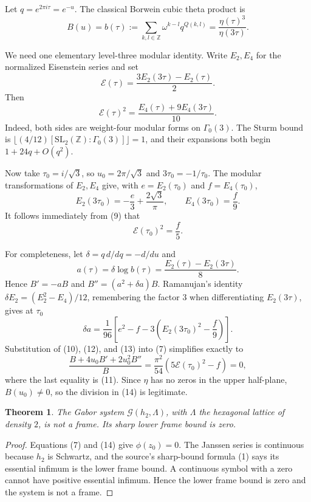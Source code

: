 \documentclass[11pt]{article}
\newtheorem{theorem}{Theorem}
\newcommand{\Z}{\mathbb Z}
\begin{document}
Let \(q=e^{2\pi i\tau}=e^{-u}\).  The classical Borwein cubic theta
product \cite{Borwein} is
\[
 B(u)=b(\tau):=\sum_{k,l\in\Z}\omega^{k-l}q^{Q(k,l)}
 =\frac{\eta(\tau)^3}{\eta(3\tau)}.                     \tag{8}
\]

We need one elementary level-three modular identity.  Write \(E_2,E_4\)
for the normalized Eisenstein series and set
\[
 \mathcal E(\tau)=\frac{3E_2(3\tau)-E_2(\tau)}2.
\]
Then
\[
 \mathcal E(\tau)^2
 =\frac{E_4(\tau)+9E_4(3\tau)}{10}.                     \tag{9}
\]
Indeed, both sides are weight-four modular forms on \(\Gamma_0(3)\).
The Sturm bound is
\(\lfloor(4/12)[\mathrm{SL}_2(\Z):\Gamma_0(3)]\rfloor=1\), and their
expansions both begin \(1+24q+O(q^2)\).

Now take \(\tau_0=i/\sqrt3\), so \(u_0=2\pi/\sqrt3\) and
\(3\tau_0=-1/\tau_0\).  The modular transformations of \(E_2,E_4\)
give, with \(e=E_2(\tau_0)\) and \(f=E_4(\tau_0)\),
\[
 E_2(3\tau_0)=-\frac e3+\frac{2\sqrt3}{\pi},
 \qquad E_4(3\tau_0)=\frac f9.                           \tag{10}
\]
It follows immediately from (9) that
\[
 \mathcal E(\tau_0)^2=\frac f5.                          \tag{11}
\]

For completeness, let \(\delta=q\,d/dq=-d/du\) and
\[
 a(\tau)=\delta\log b(\tau)
 =\frac{E_2(\tau)-E_2(3\tau)}8.                         \tag{12}
\]
Hence \(B'=-aB\) and \(B''=(a^2+\delta a)B\).  Ramanujan's identity
\(\delta E_2=(E_2^2-E_4)/12\), remembering the factor \(3\) when
differentiating \(E_2(3\tau)\), gives at \(\tau_0\)
\[
 \delta a=\frac1{96}
 \left[e^2-f-3\left(E_2(3\tau_0)^2-\frac f9\right)\right]. \tag{13}
\]
Substitution of (10), (12), and (13) into (7) simplifies exactly to
\[
 \frac{B+4u_0B'+2u_0^2B''}{B}
 =\frac{\pi^2}{54}\left(5\mathcal E(\tau_0)^2-f\right)=0, \tag{14}
\]
where the last equality is (11).  Since \(\eta\) has no zeros in the upper
half-plane, \(B(u_0)\ne0\), so the division in (14) is legitimate.

\begin{theorem}
The Gabor system \(\mathcal G(h_2,\Lambda)\), with \(\Lambda\) the
hexagonal lattice of density \(2\), is not a frame.  Its sharp lower frame
bound is zero.
\end{theorem}

\begin{proof}
Equations (7) and (14) give \(\phi(z_0)=0\).  The Janssen series is
continuous because \(h_2\) is Schwartz, and the source's sharp-bound formula
(1) says its essential infimum is the lower frame bound.  A continuous
symbol with a zero cannot have positive essential infimum.  Hence the lower
frame bound is zero and the system is not a frame.
\end{proof}
\end{document}

